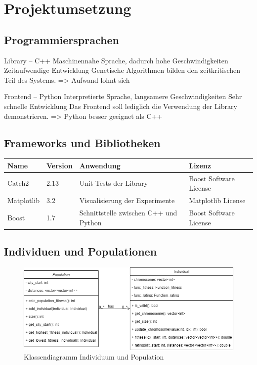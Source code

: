 
\section{Projektumsetzung}

\subsection{Programmiersprachen}

Library – C++
Maschinennahe Sprache, dadurch hohe Geschwindigkeiten
Zeitaufwendige Entwicklung
Genetische Algorithmen bilden den zeitkritischen Teil des Systems.
=> Aufwand lohnt sich

Frontend – Python
Interpretierte Sprache, langsamere Geschwindigkeiten
Sehr schnelle Entwicklung
Das Frontend soll lediglich die Verwendung der Library demonstrieren.
=> Python besser geeignet als C++


\subsection{Frameworks und Bibliotheken}

\begin{center}
\begin{tabular}{|l|l|l|l|}
 Name & Version & Anwendung & Lizenz \\ 
\hline
 Catch2 & 2.13 & Unit-Tests der Library & Boost Software License \\  
 Matplotlib & 3.2 & Visualisierung der Experimente & Matplotlib License \\
 Boost & 1.7 & Schnittstelle zwischen C++ und Python & Boost Software License    
\end{tabular}
\end{center}

\subsection{Individuen und Populationen}

\begin{figure}[H]
\centering
\includegraphics[width=1\textwidth]{img/Vortrag/uml.png}
\caption{Klassendiagramm Individuum und Population}
\label{fig:klassendiagramm}
\end{figure}


